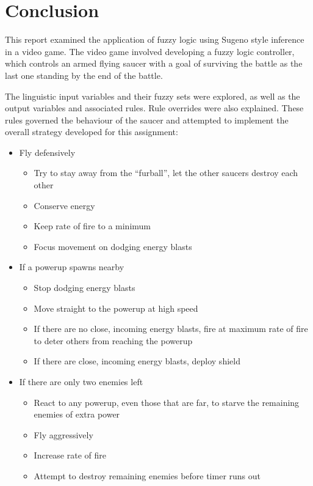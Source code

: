 \section{Conclusion}

This report examined the application of fuzzy logic using Sugeno style inference in a video game. The video game involved developing a fuzzy logic controller, which controls an armed flying saucer with a goal of surviving the battle as the last one standing by the end of the battle.

The linguistic input variables and their fuzzy sets were explored, as well as the output variables and associated rules. Rule overrides were also explained. These rules governed the behaviour of the saucer and attempted to implement the overall strategy developed for this assignment:

\begin{itemize}
\item Fly defensively
	\begin{itemize}
	\item Try to stay away from the ``furball'', let the other saucers destroy each other
	\item Conserve energy
	\item Keep rate of fire to a minimum
	\item Focus movement on dodging energy blasts
	\end{itemize}
\item If a powerup spawns nearby
	\begin{itemize}
	\item Stop dodging energy blasts
	\item Move straight to the powerup at high speed
	\item If there are no close, incoming energy blasts, fire at maximum rate of fire to deter others from reaching the powerup
	\item If there are close, incoming energy blasts, deploy shield
	\end{itemize}
\item If there are only two enemies left
	\begin{itemize}
	\item React to any powerup, even those that are far, to starve the remaining enemies of extra power
	\item Fly aggressively
	\item Increase rate of fire
	\item Attempt to destroy remaining enemies before timer runs out
	\end{itemize}
\end{itemize}

